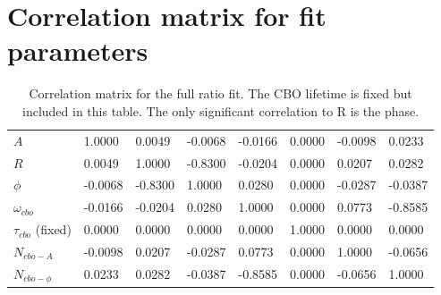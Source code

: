 \section{Correlation matrix for fit parameters}

\begin{table}[H]
\setlength\tabcolsep{0pt}
\begin{tabular*}{\linewidth}{@{\extracolsep{\fill}}lLLLLLLL{c}}
  \toprule
            &  &  & \thead{$\phi$} &  &  &  &  \\
  \midrule
	$A$    			 	 &  1.0000  &  0.0049  & -0.0068  & -0.0166  &  0.0000  & -0.0098  &  0.0233  \\
	$R$     			 &  0.0049  &  1.0000  & -0.8300  & -0.0204  &  0.0000  &  0.0207  &  0.0282  \\
	$\phi$   			 & -0.0068  & -0.8300  &  1.0000  &  0.0280  &  0.0000  & -0.0287  & -0.0387  \\
	$\omega_{cbo}$   	 & -0.0166  & -0.0204  &  0.0280  &  1.0000  &  0.0000  &  0.0773  & -0.8585  \\
	$\tau_{cbo}$ (fixed) &  0.0000  &  0.0000  &  0.0000  &  0.0000  &  1.0000  &  0.0000  &  0.0000  \\
	$N_{cbo-A}$   	 	 & -0.0098  &  0.0207  & -0.0287  &  0.0773  &  0.0000  &  1.0000  & -0.0656  \\
	$N_{cbo-\phi}$   	 &  0.0233  &  0.0282  & -0.0387  & -0.8585  &  0.0000  & -0.0656  &  1.0000  \\
  \bottomrule
\end{tabular*}
\caption{Correlation matrix for the full ratio fit. The CBO lifetime is fixed but included in this table. The only significant correlation to R is the \gmtwo phase.}
\end{table}



